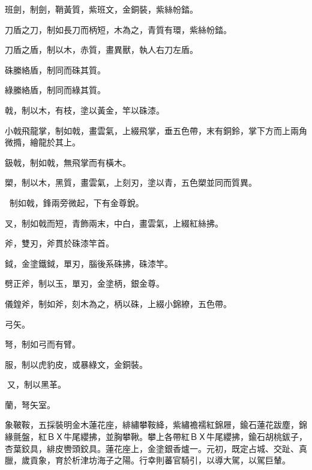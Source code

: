 \begin{pinyinscope}
 班劍，制劍，鞘黃質，紫班文，金銅裝，紫絲帉錔。



 刀盾之刀，制如長刀而柄短，木為之，青質有環，紫絲帉錔。



 刀盾之盾，制以木，赤質，畫異獸，執人右刀左盾。



 硃縢絡盾，制同而硃其質。



 綠縢絡盾，制同而綠其質。



 戟，制以木，有枝，塗以黃金，竿以硃漆。



 小戟飛龍掌，制如戟，畫雲氣，上綴飛掌，垂五色帶，末有銅鈴，掌下方而上兩角微撱，繪龍於其上。



 鈒戟，制如戟，無飛掌而有橫木。



 槊，制以木，黑質，畫雲氣，上刻刃，塗以青，五色槊並同而質異。



 ，制如戟，鋒兩旁微起，下有金尊銳。



 叉，制如戟而短，青飾兩末，中白，畫雲氣，上綴紅絲拂。



 斧，雙刃，斧貫於硃漆竿首。



 鉞，金塗鐵鉞，單刃，腦後系硃拂，硃漆竿。



 劈正斧，制以玉，單刃，金塗柄，銀金尊。



 儀鍠斧，制如斧，刻木為之，柄以硃，上綴小錦繚，五色帶。



 弓矢。



 弩，制如弓而有臂。



 服，制以虎豹皮，或暴綠文，金銅裝。



 又，制以黑革。



 蘭，弩矢室。



 象鞁鞍，五採裝明金木蓮花座，緋繡攀鞍絳，紫繡襜襦紅錦屜，鍮石蓮花跋塵，錦緣氈盤，紅ＢＸ牛尾纓拂，並胸攀鞦。攀上各帶紅ＢＸ牛尾纓拂，鍮石胡桃鈸子，杏葉鉸具，緋皮轡頭鉸具。蓮花座上，金塗銀香爐一。元初，既定占城、交趾、真臘，歲貢象，育於析津坊海子之陽。行幸則蕃官騎引，以導大駕，以駕巨輦。




\end{pinyinscope}
